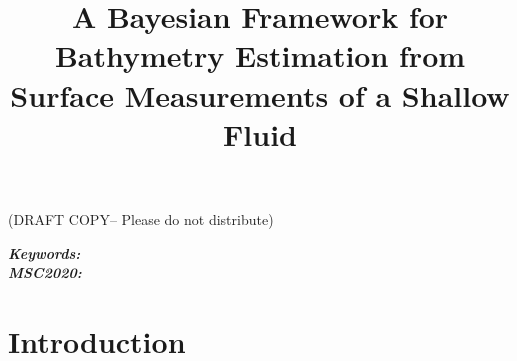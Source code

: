 \documentclass[18pt]{article}
\title{A Bayesian Framework for Bathymetry Estimation from Surface Measurements of a Shallow Fluid}
\numberwithin{equation}{subsection}
\begin{document}
{(DRAFT COPY-- Please do not distribute)}

\maketitle

\begin{abstract}
\end{abstract}

{\noindent \small {\it \bf Keywords:} \\
  {\it \bf MSC2020:}}

\newpage

\setcounter{tocdepth}{2}
\tableofcontents




\newpage


\section{Introduction}\label{sec:intro}
\end{document}
